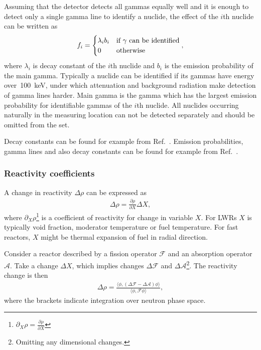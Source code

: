 Assuming that the detector detects all gammas equally well and it is enough to detect only a single gamma line to identify a nuclide, the effect of the $i$th nuclide can be written as
%
\begin{gather}
f_i = 
\begin{cases}
\lambda_ib_i & \textnormal{if $\gamma$ can be identified} \\
0   & \textnormal{otherwise}
\end{cases},
\end{gather}
%
where $\lambda_i$ is decay constant of the $i$th nuclide and $b_i$ is the emission probability of the main gamma. Typically a nuclide can be identified if its gammas have energy over~\SI{100}{keV}, under which attenuation and background radiation make detection of gamma lines harder. Main gamma is the gamma which has the largest emission probability for identifiable gammas of the $i$th nuclide. All nuclides occurring naturally in the measuring location can not be detected separately and should be omitted from the set.~\cite{Debertin}

Decay constants can be found for example from Ref.~\cite{nndc}. Emission probabilities, gamma lines and also decay constants can be found for example from Ref.~\cite{table_of_radioactive_isotopes}.



\subsubsection*{Reactivity coefficients}

A change in reactivity $\Delta \rho$ can be expressed as
%
\begin{gather}
\Delta \rho = \frac{\partial\rho}{\partial X}\Delta X,
\end{gather}
%
where $\partial_X\rho$\footnote{$\partial_X\rho=\frac{\partial\rho}{\partial X}$} is a coefficient of reactivity for change in variable $X$. For LWRs $X$ is typically void fraction, moderator temperature or fuel temperature. For fast reactors, $X$ might be thermal expansion of fuel in radial direction.

Consider a reactor described by a fission operator $\mathcal{F}$ and an absorption operator $\mathcal{A}$. Take a change $\Delta X$, which implies changes $\Delta \mathcal{F}$ and $\Delta \mathcal{A}$\footnote{Omitting any dimensional changes.}. The reactivity change is then
%
\begin{gather}
\Delta\rho = \frac{
\langle \phi, (\Delta \mathcal{F}-\Delta \mathcal{A})\phi\rangle
}{
\langle \phi, \mathcal{F}\phi\rangle
}
,
\end{gather}
%
where the brackets indicate integration over neutron phase space.~\cite{Stacey2001}

